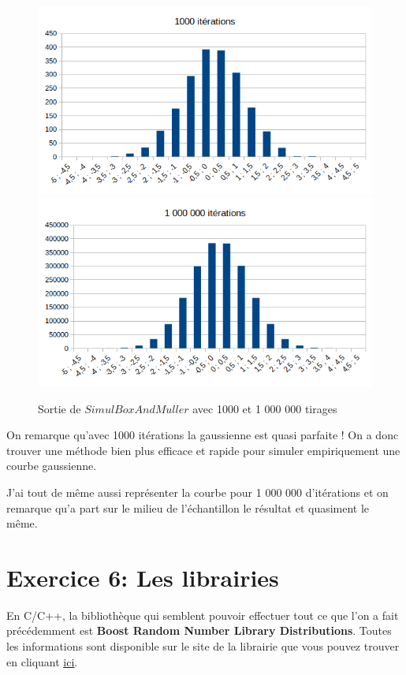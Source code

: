 \documentclass[12pt,french]{article} %
\begin{document}
\begin{figure}[H]
	\centering
	\includegraphics[scale=0.35]{exo5-5.png}
	\includegraphics[scale=0.35]{exo5-6.png}
	\caption{Sortie de $SimulBoxAndMuller$ avec 1000 et 1 000 000 tirages}    
\end{figure}

On remarque qu'avec 1000 itérations la gaussienne est quasi parfaite ! On a donc trouver une méthode bien plus efficace et rapide pour simuler empiriquement une courbe gaussienne.

J'ai tout de même aussi représenter la courbe pour 1 000 000 d'itérations et on remarque qu'a part sur le milieu de l'échantillon le résultat et quasiment le même.

\section{Exercice 6: Les librairies}

En C/C++, la bibliothèque qui semblent pouvoir effectuer tout ce que l'on a fait précédemment est \textbf{Boost Random Number Library Distributions}. Toutes les informations sont disponible sur le site de la librairie que vous pouvez trouver en cliquant \href{https://www.boost.org/doc/libs/1_39_0/libs/random/}{\underline{ici}}.
\end{document}
